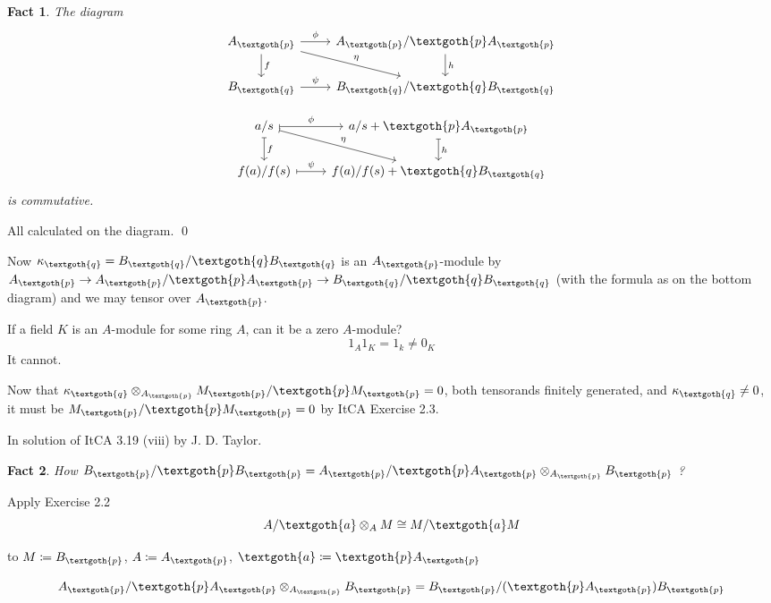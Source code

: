 \documentclass{article}
\newtheorem{theorem}{Fact}[section]
\begin{document}
\bigskip
\begin{theorem}
The diagram
\[
     \begin{tikzcd}
     A_\textgoth{p} \arrow{r}{\phi} \arrow{d}{f} \arrow{dr}{\eta} & A_\textgoth{p}/\textgoth{p}A_\textgoth{p} \arrow{d}{h} \\
     B_\textgoth{q} \arrow{r}{\psi} & B_\textgoth{q}/\textgoth{q}B_\textgoth{q}
     \end{tikzcd}
\]

\[
     \begin{tikzcd}
     a/s \arrow[r, mapsto, "\phi"] \arrow[d, mapsto, "f"] \arrow[dr, mapsto, "\eta"] & a/s + \textgoth{p}A_\textgoth{p} \arrow[d, mapsto, "h"] \\
     f(a)/f(s) \arrow[r, mapsto, "\psi"] & f(a)/f(s) + \textgoth{q}B_\textgoth{q}
     \end{tikzcd}
\]
is commutative.
\end{theorem}

All calculated on the diagram. \qed

Now $\kappa_\textgoth{q} = B_\textgoth{q}/\textgoth{q}B_\textgoth{q}$ is an $A_\textgoth{p}$-module by $A_\textgoth{p} \rightarrow A_\textgoth{p}/\textgoth{p}A_\textgoth{p} \rightarrow B_\textgoth{q}/\textgoth{q}B_\textgoth{q}$ (with the formula as on the bottom diagram) and we may tensor over $A_\textgoth{p}$. 

If a field $K$ is an $A$-module for some ring $A$, can it be a zero $A$-module?
\[
 1_A 1_K = 1_k \ne 0_K
\]
It cannot.

Now that $\kappa_\textgoth{q} \otimes_{A_\textgoth{p}} M_\textgoth{p}/\textgoth{p}M_\textgoth{p} = 0$, both tensorands finitely generated, and $\kappa_\textgoth{q} \ne 0$, it must be $M_\textgoth{p}/\textgoth{p}M_\textgoth{p} = 0$ by ItCA Exercise 2.3. 

In solution of ItCA 3.19 (viii) by J. D. Taylor.

\bigskip
\begin{theorem}
How $B_\textgoth{p}/\textgoth{p} B_\textgoth{p} = A_\textgoth{p}/\textgoth{p} A_\textgoth{p} \otimes_{A_\textgoth{p}} B_\textgoth{p}$ ?
\end{theorem}

Apply Exercise 2.2
\[
 A/\textgoth{a} \otimes_A M \cong M / \textgoth{a} M 
\]

\noindent
to $M \coloneqq B_\textgoth{p}$, $A \coloneqq A_\textgoth{p}$, $\textgoth{a} \coloneqq \textgoth{p} A_\textgoth{p}$

\[
 A_\textgoth{p}/\textgoth{p} A_\textgoth{p} \otimes_{A_\textgoth{p}} B_\textgoth{p} = B_\textgoth{p}/(\textgoth{p} A_\textgoth{p}) B_\textgoth{p}
\]
\end{document}
